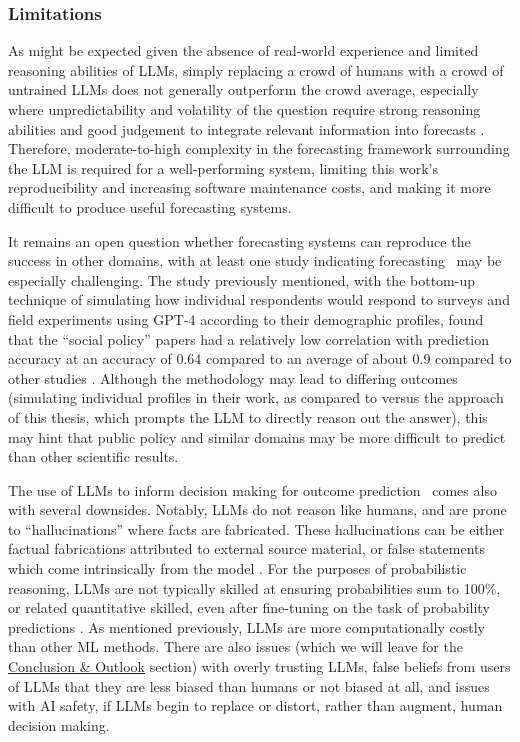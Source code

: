 \documentclass[12pt,a4paper]{article}
\begin{document}
\subsubsection{Limitations}
\label{sub:limitations}
As might be expected given the absence of real-world experience and limited reasoning abilities of LLMs, simply replacing a crowd of humans with a crowd of untrained LLMs does not generally outperform the crowd average, especially where unpredictability and volatility of the question require strong reasoning abilities and good judgement to integrate relevant information into forecasts  . Therefore, moderate-to-high complexity in the forecasting framework surrounding the LLM is required for a well-performing system, limiting this work's reproducibility and increasing software maintenance costs, and making it more difficult to produce useful forecasting systems.

It remains an open question whether forecasting systems can reproduce the success in other domains, with at least one study indicating forecasting \ABSTRACT\ may be especially challenging. The study previously mentioned, with the bottom-up technique of simulating how individual respondents would respond to surveys and field experiments using GPT-4 according to their demographic profiles, found that the ``social policy'' papers had a relatively low correlation with prediction accuracy at an accuracy of 0.64 compared to an average of about 0.9 compared to other studies . Although the methodology may lead to differing outcomes (simulating individual profiles in their work, as compared to versus the approach of this thesis, which prompts the LLM to directly reason out the answer), this may hint that public policy and similar domains may be more difficult to predict than other scientific results.

The use of LLMs to inform decision making for outcome prediction \ABSTRACT\ comes also with several downsides. Notably, LLMs do not reason like humans, and are prone to ``hallucinations''  where facts are fabricated. These hallucinations can be either factual fabrications attributed to external source material, or false statements which come intrinsically from the model . For the purposes of probabilistic reasoning, LLMs are not typically skilled at ensuring probabilities sum to 100\%, or related quantitative skilled, even after fine-tuning on the task of probability predictions . As mentioned previously, LLMs are more computationally costly than other ML methods. There are also issues (which we will leave for the \hyperref[sec:conclusion_outlook]{Conclusion \& Outlook} section) with overly trusting LLMs, false beliefs from users of LLMs that they are less biased than humans or not biased at all, and issues with AI safety, if LLMs begin to replace or distort, rather than augment, human decision making.
\end{document}
